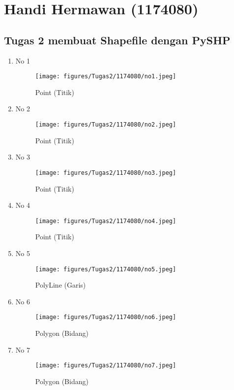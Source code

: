\section{Handi Hermawan (1174080)}
\subsection{Tugas 2 membuat Shapefile dengan PySHP}
\begin{enumerate}
	\item No 1
	
	\begin{figure}[H]
		\texttt{[image: figures/Tugas2/1174080/no1.jpeg]}
		\centering
		\caption{Point (Titik)}
	\end{figure}
	\item No 2
	
	\begin{figure}[H]
		\texttt{[image: figures/Tugas2/1174080/no2.jpeg]}
		\centering
		\caption{Point (Titik)}
	\end{figure}
	\item No 3
	
	\begin{figure}[H]
		\texttt{[image: figures/Tugas2/1174080/no3.jpeg]}
		\centering
		\caption{Point (Titik)}
	\end{figure}
	\item No 4
	
	\begin{figure}[H]
		\texttt{[image: figures/Tugas2/1174080/no4.jpeg]}
		\centering
		\caption{Point (Titik)}
	\end{figure}
	\item No 5
	
	\begin{figure}[H]
		\texttt{[image: figures/Tugas2/1174080/no5.jpeg]}
		\centering
		\caption{PolyLine (Garis)}
	\end{figure}
	\item No 6
	
	\begin{figure}[H]
		\texttt{[image: figures/Tugas2/1174080/no6.jpeg]}
		\centering
		\caption{Polygon (Bidang)}
	\end{figure}
	\item No 7
	
	\begin{figure}[H]
		\texttt{[image: figures/Tugas2/1174080/no7.jpeg]}
		\centering
		\caption{Polygon (Bidang)}

\end{figure}
\end{enumerate}
